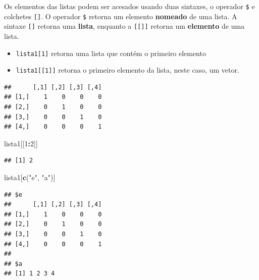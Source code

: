 \documentclass[
]{book}
\newenvironment{Shaded}{\begin{snugshade}}{\end{snugshade}}
\newcommand{\CommentTok}[1]{\textcolor[rgb]{0.56,0.35,0.01}{\textit{#1}}}
\newcommand{\DecValTok}[1]{\textcolor[rgb]{0.00,0.00,0.81}{#1}}
\newcommand{\KeywordTok}[1]{\textcolor[rgb]{0.13,0.29,0.53}{\textbf{#1}}}
\newcommand{\NormalTok}[1]{#1}
\newcommand{\OperatorTok}[1]{\textcolor[rgb]{0.81,0.36,0.00}{\textbf{#1}}}
\newcommand{\StringTok}[1]{\textcolor[rgb]{0.31,0.60,0.02}{#1}}
\providecommand{\tightlist}{%
  \setlength{\itemsep}{0pt}\setlength{\parskip}{0pt}}
\theoremstyle{definition}
\theoremstyle{definition}
\theoremstyle{definition}
\theoremstyle{remark}
\begin{document}
Os elementos das listas podem ser acesados usando duas sintaxes, o operador \texttt{\$} e colchetes \texttt{{[}{]}}. O operador \texttt{\$} retorna um elemento \textbf{nomeado} de uma lista. A sintaxe \texttt{{[}{]}} retorna uma \textbf{lista}, enquanto a \texttt{{[}{[}{]}{]}} retorna um \textbf{elemento} de uma lista.

\begin{itemize}
\tightlist
\item
  \texttt{lista1{[}1{]}} retorna uma lista que contém o primeiro elemento
\item
  \texttt{lista1{[}{[}1{]}{]}} retorna o primeiro elemento da lista, neste caso, um vetor.
\end{itemize}

\begin{Shaded}
\end{Shaded}

\begin{verbatim}
##      [,1] [,2] [,3] [,4]
## [1,]    1    0    0    0
## [2,]    0    1    0    0
## [3,]    0    0    1    0
## [4,]    0    0    0    1
\end{verbatim}

\begin{Shaded}
\begin{Highlighting}[]
\NormalTok{lista1[[}\DecValTok{1}\OperatorTok{:}\DecValTok{2}\NormalTok{]]}
\end{Highlighting}
\end{Shaded}

\begin{verbatim}
## [1] 2
\end{verbatim}

\begin{Shaded}
\begin{Highlighting}[]
\NormalTok{lista1[}\KeywordTok{c}\NormalTok{(}\StringTok{"e"}\NormalTok{, }\StringTok{"a"}\NormalTok{)]}
\end{Highlighting}
\end{Shaded}

\begin{verbatim}
## $e
##      [,1] [,2] [,3] [,4]
## [1,]    1    0    0    0
## [2,]    0    1    0    0
## [3,]    0    0    1    0
## [4,]    0    0    0    1
## 
## $a
## [1] 1 2 3 4
\end{verbatim}
\end{document}
